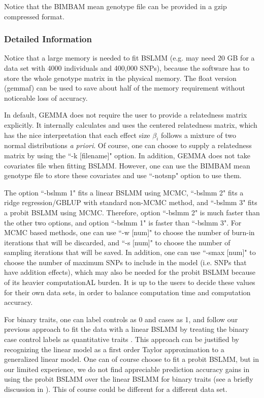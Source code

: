 \documentclass[11pt]{article}
\begin{document}
Notice that the BIMBAM mean genotype file can be provided in a gzip compressed format.

\subsubsection{Detailed Information}
Notice that a large memory is needed to fit BSLMM (e.g. may need 20 GB for a data set with 4000 individuals and 400,000 SNPs), because the software has to store the whole genotype matrix in the physical memory. The float version (gemmaf) can be used to save about half of the memory requirement without noticeable loss of accuracy. 

In default, GEMMA does not require the user to provide a relatedness matrix explicitly. It internally calculates and uses the centered relatedness matrix, which has the nice interpretation that each effect size $\beta_i$ follows a mixture of two normal distributions {\it a priori}. Of course, one can choose to supply a relatedness matrix by using the ``-k [filename]" option. In addition, GEMMA does not take covariates file when fitting BSLMM. However, one can use the BIMBAM mean genotype file to store these covariates and use ``-notsnp" option to use them. 

The option ``-bslmm 1" fits a linear BSLMM using MCMC, ``-bslmm 2" fits a ridge regression/GBLUP with standard non-MCMC method, and ``-bslmm 3" fits a probit BSLMM using MCMC. Therefore, option ``-bslmm 2" is much faster than the other two options, and option ``-bslmm 1" is faster than ``-bslmm 3". For MCMC based methods, one can use ``-w [num]" to choose the number of burn-in iterations that will be discarded, and ``-s [num]" to choose the number of sampling iterations that will be saved. In addition, one can use ``-smax [num]" to choose the number of maximum SNPs to include in the model (i.e. SNPs that have addition effects), which may also be needed for the probit BSLMM because of its heavier computationAL burden. It is up to the users to decide these values for their own data sets, in order to balance computation time and computation accuracy. 

For binary traits, one can label controls as 0 and cases as 1, and follow our previous approach to fit the data with a linear BSLMM by treating the binary case control labels as quantitative traits \cite{Zhou:2013}. This approach can be justified by recognizing the linear model as a first order Taylor approximation to a generalized linear model. One can of course choose to fit a probit BSLMM, but in our limited experience, we do not find appreciable prediction accuracy gains in using the probit BSLMM over the linear BSLMM for binary traits (see a briefly discussion in \cite{Zhou:2013}). This of course could be different for a different data set.
\end{document}
